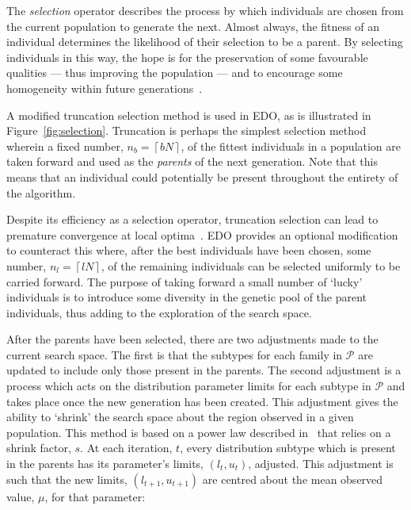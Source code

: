 The \emph{selection} operator describes the process by which individuals are
chosen from the current population to generate the next. Almost always, the
fitness of an individual determines the likelihood of their selection to be a
parent. By selecting individuals in this way, the hope is for the preservation
of some favourable qualities --- thus improving the population --- and to
encourage some homogeneity within future generations~\cite{Back1994}.


A modified truncation selection method is used in EDO, as is illustrated in
Figure~\ref{fig:selection}. Truncation is perhaps the simplest selection method
wherein a fixed number, \(n_b = \left\lceil b N\right\rceil\), of the fittest
individuals in a population are taken forward and used as the \emph{parents} of
the next generation. Note that this means that an individual could potentially
be present throughout the entirety of the algorithm.

Despite its efficiency as a selection operator, truncation selection can lead to
premature convergence at local optima~\cite{Jebari2013,Motoki2002}. EDO provides
an optional modification to counteract this where, after the best individuals
have been chosen, some number, \(n_l = \left\lceil l N\right\rceil\), of the
remaining individuals can be selected uniformly to be carried forward. The
purpose of taking forward a small number of `lucky' individuals is to introduce
some diversity in the genetic pool of the parent individuals, thus adding to the
exploration of the search space.

After the parents have been selected, there are two adjustments made to the
current search space. The first is that the subtypes for each family in
\(\mathcal{P}\) are updated to include only those present in the parents. The
second adjustment is a process which acts on the distribution parameter limits
for each subtype in \(\mathcal{P}\) and takes place once the new generation has
been created. This adjustment gives the ability to `shrink' the search space
about the region observed in a given population. This method is based on a power
law described in~\cite{Amirjanov2016} that relies on a shrink factor, \(s\). At
each iteration, \(t\), every distribution subtype which is present in the
parents has its parameter's limits, \(\left(l_t, u_t\right)\), adjusted. This
adjustment is such that the new limits, \(\left(l_{t+1}, u_{t+1}\right)\) are
centred about the mean observed value, \(\mu\), for that parameter:

